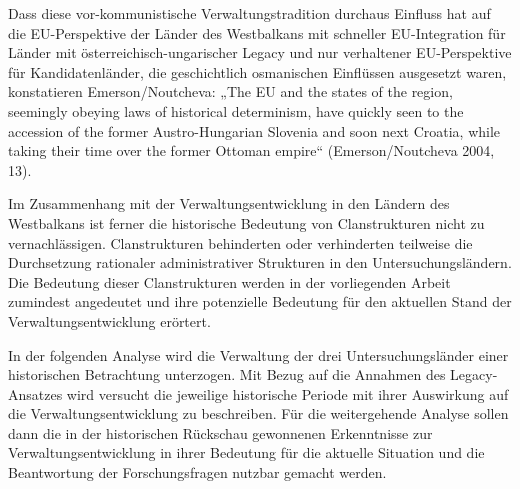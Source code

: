 Dass diese vor-kommunistische Verwaltungstradition durchaus Einfluss hat auf die EU-Perspektive der Länder des Westbalkans mit schneller EU-Integration für Länder mit österreichisch-ungarischer Legacy und nur verhaltener EU-Perspektive für Kandidatenländer, die geschichtlich osmanischen Einflüssen ausgesetzt waren, konstatieren Emerson/Noutcheva: „The EU and the states of the region, seemingly obeying laws of historical determinism, have quickly seen to the accession of the former Austro-Hungarian Slovenia and soon next Croatia, while taking their time over the former Ottoman empire“ (Emerson/Noutcheva 2004, 13). \par
Im Zusammenhang mit der Verwaltungsentwicklung in den Ländern des Westbalkans ist ferner die historische Bedeutung von Clanstrukturen nicht zu vernachlässigen. Clanstrukturen behinderten oder verhinderten teilweise die Durchsetzung rationaler administrativer Strukturen in den Untersuchungsländern. Die Bedeutung dieser Clanstrukturen werden in der vorliegenden Arbeit zumindest angedeutet und ihre potenzielle Bedeutung für den aktuellen Stand der Verwaltungsentwicklung erörtert.\par
In der folgenden Analyse wird die Verwaltung der drei Untersuchungsländer einer historischen Betrachtung unterzogen. Mit Bezug auf die Annahmen des Legacy-Ansatzes wird versucht die jeweilige historische Periode mit ihrer Auswirkung auf die Verwaltungsentwicklung zu beschreiben. Für die weitergehende Analyse sollen dann die in der historischen Rückschau gewonnenen Erkenntnisse zur Verwaltungsentwicklung in ihrer Bedeutung für die aktuelle Situation und die Beantwortung der Forschungsfragen nutzbar gemacht werden.


